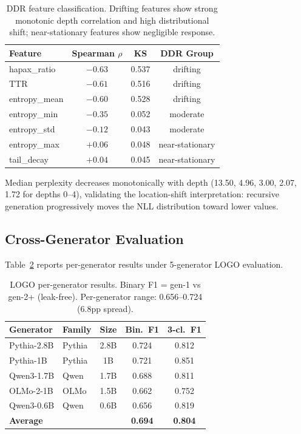 \documentclass[11pt,a4paper]{article}
\begin{document}
\begin{table}[t]
\centering
\small
\begin{tabular}{lccc}
\toprule
\textbf{Feature} & \textbf{Spearman $\rho$} & \textbf{KS} & \textbf{DDR Group} \\
\midrule
hapax\_ratio & $-0.63$ & 0.537 & drifting \\
TTR & $-0.61$ & 0.516 & drifting \\
entropy\_mean & $-0.60$ & 0.528 & drifting \\
entropy\_min & $-0.35$ & 0.052 & moderate \\
entropy\_std & $-0.12$ & 0.043 & moderate \\
entropy\_max & $+0.06$ & 0.048 & near-stationary \\
tail\_decay & $+0.04$ & 0.045 & near-stationary \\
\bottomrule
\end{tabular}
\caption{DDR feature classification. Drifting features show strong monotonic depth correlation and high distributional shift; near-stationary features show negligible response.}
\label{tab:ddr}
\end{table}

Median perplexity decreases monotonically with depth (13.50, 4.96, 3.00, 2.07, 1.72 for depths 0--4), validating the location-shift interpretation: recursive generation progressively moves the NLL distribution toward lower values.

\subsection{Cross-Generator Evaluation}
\label{sec:cross_gen}

Table~\ref{tab:logo} reports per-generator results under 5-generator LOGO evaluation.

\begin{table}[t]
\centering
\small
\begin{tabular}{llccc}
\toprule
\textbf{Generator} & \textbf{Family} & \textbf{Size} & \textbf{Bin.~F1} & \textbf{3-cl.~F1} \\
\midrule
Pythia-2.8B & Pythia & 2.8B & 0.724 & 0.812 \\
Pythia-1B & Pythia & 1B & 0.721 & 0.851 \\
Qwen3-1.7B & Qwen & 1.7B & 0.688 & 0.811 \\
OLMo-2-1B & OLMo & 1.5B & 0.662 & 0.752 \\
Qwen3-0.6B & Qwen & 0.6B & 0.656 & 0.819 \\
\midrule
\textbf{Average} & & & \textbf{0.694} & \textbf{0.804} \\
\bottomrule
\end{tabular}
\caption{LOGO per-generator results. Binary F1 = gen-1 vs gen-2+ (leak-free). Per-generator range: 0.656--0.724 (6.8pp spread).}
\label{tab:logo}
\end{table}
\end{document}

